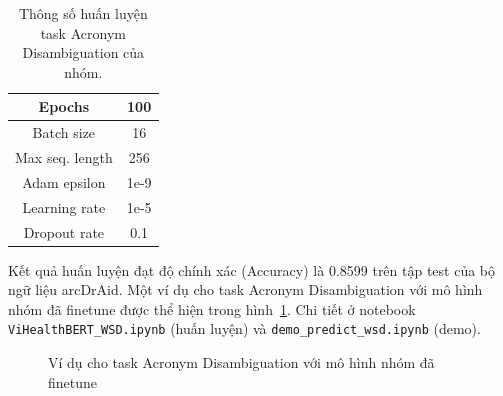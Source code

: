 \begin{table}
\centering
\begin{tabular}{|c|c|}
\hline
Epochs & 100 \\ \hline
Batch size & 16 \\ \hline
Max seq. length & 256 \\ \hline
Adam epsilon & 1e-9 \\ \hline
Learning rate & 1e-5 \\ \hline
Dropout rate & 0.1 \\ \hline
\end{tabular}
\caption{Thông số huấn luyện task Acronym Disambiguation của nhóm.}
\label{tab:experiments-self-ad}
\end{table}

Kết quả huấn luyện đạt độ chính xác (Accuracy) là 0.8599 trên tập test của bộ ngữ liệu arcDrAid. Một ví dụ cho task Acronym Disambiguation với mô hình nhóm đã finetune được thể hiện trong hình~\ref{fig:demo-wsd-output}. Chi tiết ở notebook \texttt{ViHealthBERT\_WSD.ipynb} (huấn luyện) và \texttt{demo\_predict\_wsd.ipynb} (demo).

\begin{figure}
\centering
{}
\caption{Ví dụ cho task Acronym Disambiguation với mô hình nhóm đã finetune}
\label{fig:demo-wsd-output}
\end{figure}